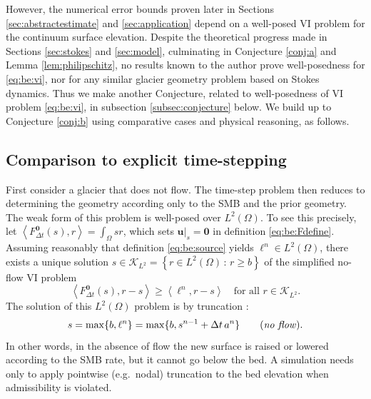 \documentclass[hidelinks,onefignum,onetabnum,final]{siamart220329}  %
\newcommand{\bu}{\mathbf{u}}
\newcommand{\bzero}{\bm{0}}
\newcommand{\cK}{\mathcal{K}}
\newcommand{\ip}[2]{\left<#1,#2\right>}
\begin{document}
However, the numerical error bounds proven later in Sections \ref{sec:abstractestimate} and \ref{sec:application} depend on a well-posed VI problem for the continuum surface elevation.  Despite the theoretical progress made in Sections \ref{sec:stokes} and \ref{sec:model}, culminating in Conjecture \ref{conj:a} and Lemma \ref{lem:philipschitz}, no results known to the author prove well-posedness for \eqref{eq:be:vi}, nor for any similar glacier geometry problem based on Stokes dynamics.  Thus we make another Conjecture, related to well-posedness of VI problem \eqref{eq:be:vi}, in subsection \ref{subsec:conjecture} below.  We build up to Conjecture \ref{conj:b} using comparative cases and physical reasoning, as follows.

\subsection{Comparison to explicit time-stepping} \label{subsec:explicit}   First consider a glacier that does not flow.  The time-step problem then reduces to determining the geometry according only to the SMB and the prior geometry.  The weak form of this problem is well-posed over $L^2(\Omega)$.  To see this precisely, let $\ip{F^{\bzero}_{\Delta t}(s)}{r} = \int_\Omega sr$, which sets $\bu|_s=\bzero$ in definition \eqref{eq:be:Fdefine}.  Assuming reasonably that definition \eqref{eq:be:source} yields $\ell^n \in L^2(\Omega)$, there exists a unique solution $s \in \cK_{L^2} = \left\{r\in L^2(\Omega)\,:\,r \ge b\right\}$ of the simplified no-flow VI problem
\begin{equation}
\ip{F^{\bzero}_{\Delta t}(s)}{r-s} \ge \ip{\ell^n}{r-s} \quad \text{for all } r \in \cK_{L^2}.
\end{equation}
The solution of this $L^2(\Omega)$ problem is by truncation \cite[section II.3]{KinderlehrerStampacchia1980}:
\begin{equation}
s = \max\{b, \ell^n\} = \max\{b, s^{n-1} + \Delta t\,a^n\} \qquad (\text{\emph{no flow}}).
\end{equation}
In other words, in the absence of flow the new surface is raised or lowered according to the SMB rate, but it cannot go below the bed.  A simulation needs only to apply pointwise (e.g.~nodal) truncation to the bed elevation when admissibility is violated.
\end{document}
